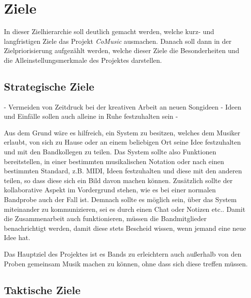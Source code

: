 \documentclass[12pt]{scrartcl}
\begin{document}

\section{Ziele}

In dieser Zielhierarchie soll deutlich gemacht werden, welche kurz- und langfristigen Ziele das Projekt \emph{CoMusic} ausmachen. Danach soll dann in der Zielpriorisierung aufgezählt werden, welche dieser Ziele die Besonderheiten und die Alleinstellungsmerkmale des Projektes darstellen.

\subsection{Strategische Ziele}


- Vermeiden von Zeitdruck bei der kreativen Arbeit an neuen Songideen
- Ideen und Einfälle sollen auch alleine in Ruhe festzuhalten sein
- 


Aus dem Grund wäre es hilfreich, ein System zu besitzen, welches dem Musiker erlaubt, von sich zu Hause oder an einem beliebigen Ort seine Idee festzuhalten und mit den Bandkollegen zu teilen. Das System sollte also Funktionen bereitstellen, in einer bestimmten musikalischen Notation oder nach einen bestimmten Standard, z.B. MIDI, Ideen festzuhalten und diese mit den anderen teilen, so dass diese sich ein Bild davon machen können. Zusätzlich sollte der kollaborative Aspekt im Vordergrund stehen, wie es bei einer normalen Bandprobe auch der Fall ist. Demnach sollte es möglich sein, über das System miteinander zu kommunizieren, sei es durch einen Chat oder Notizen etc.. Damit die Zusammenarbeit auch funktionieren, müssen die Bandmitglieder benachrichtigt werden, damit diese stets Bescheid wissen, wenn jemand eine neue Idee hat.

Das Hauptziel des Projektes ist es Bands zu erleichtern auch außerhalb von den Proben gemeinsam Musik machen zu können, ohne dass sich diese treffen müssen.

\subsection{Taktische Ziele}
\end{document}
